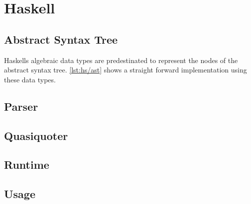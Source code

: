 \section{Haskell}

\subsection{Abstract Syntax Tree}

Haskells algebraic data types are predestinated to represent the nodes of the abstract syntax tree.
\autoref{lst:hs/ast} shows a straight forward implementation using these data types.



\subsection{Parser}



\subsection{Quasiquoter}



\subsection{Runtime}



\subsection{Usage}


